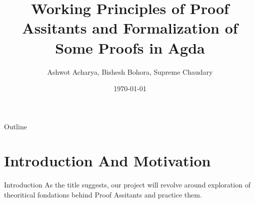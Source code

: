 \documentclass{beamer}
\title{Working Principles of Proof Assitants and Formalization of Some Proofs in Agda}
\author{Ashwot Acharya, Bishesh Bohora, Supreme Chaudary}
\institute{Kathmandu University}
\date{\today}
\begin{document}
\begin{frame}
  \titlepage
\end{frame}

\begin{frame}{Outline}
  \tableofcontents
\end{frame}

\section{Introduction And Motivation}

\begin{frame}{Introduction}
    As the title suggests, our project will revolve around exploration of theoritical fondations behind Proof Assitants and practice them.

    
\end{frame}
\end{document}
